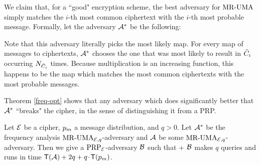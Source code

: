 We claim that, for a ``good" encryption scheme, the best adversary for $\textnormal{MR-UMA}$ simply matches the $i$-th most common ciphertext with the $i$-th most probable message. Formally, let the adversary ${\mathcal A}^*$ be the following:

\begin{figure}[H]
 \centering
{}  
\end{figure}

	
 Note that this adversary literally picks the most likely map. For every map of messages to ciphertexts, ${\mathcal A}^*$ chooses the one that was most likely to result in $\tilde{C}_i$ occurring $N_{\tilde{C}_i}$ times. Because multiplication is an increasing function, this happens to be the map which matches the most common ciphertexts with the most probable messages.
 
Theorem \ref{freq-opt} shows that any adversary which does significantly better that ${\mathcal A}^*$ ``breaks" the cipher, in the sense of distinguishing it from a PRP.
\begin{theorem}
	\label{freq-opt}
Let ${\cal E}$ be a cipher, $p_m$ a message distribution, and $q>0$. Let
${\mathcal A}^*$ be the frequency analysis $\textnormal{MR-UMA}_{{\cal E},q}$-adversary and ${\mathcal A}$
be some $\textnormal{MR-UMA}_{{\cal E},q}$-adversary. Then we give a
$\textnormal{PRP}_{\cal E}$-adversary ${\mathcal B}$ such that
\bnm
   \le 
         + \AdvPRP{\cipher}{\advB}
\enm
${\mathcal B}$ makes $q$ queries and runs in time 
$\textsf{T}({\mathcal A}) + 2q+q{\hspace{-0.1ex}}{\hspace{-0.1ex}}{\hspace{-0.1ex}}\cdot{\hspace{-0.1ex}}{\hspace{-0.1ex}}{\hspace{-0.1ex}}\textsf{T}(p_m)$.
\end{theorem}

